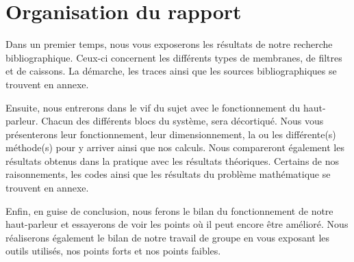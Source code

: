 \section{Organisation du rapport}

Dans un premier temps, nous vous exposerons les résultats de notre recherche bibliographique. Ceux-ci concernent les différents types de membranes, de filtres et de caissons. La démarche, les traces ainsi que les sources bibliographiques se trouvent en annexe.

Ensuite, nous entrerons dans le vif du sujet avec le fonctionnement du haut-parleur. Chacun des différents blocs du système, sera décortiqué. Nous vous présenterons leur fonctionnement, leur dimensionnement, la ou les différente(s) méthode(s) pour y arriver ainsi que nos calculs. Nous compareront également les résultats obtenus dans la pratique avec les résultats théoriques. Certains de nos raisonnements, les codes ainsi que les résultats du problème mathématique se trouvent en annexe.

Enfin, en guise de conclusion, nous ferons le bilan du fonctionnement de notre haut-parleur et essayerons de voir les points où il peut encore être amélioré. Nous réaliserons également le bilan de notre travail de groupe en vous exposant les outils utilisés, nos points forts et nos points faibles.